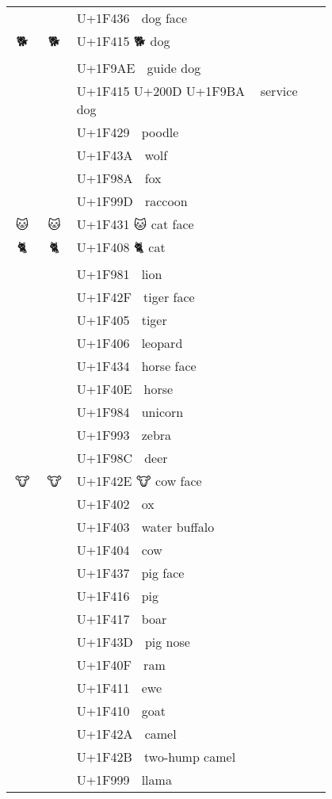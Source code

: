\documentclass[a4paper,12pt]{ltjarticle}
\newcommand{\fontA}[1]{{\fontspec[RawFeature={mode=harf,+dist,+ccmp}]{Segoe UI Emoji} #1}}
\newcommand{\fontB}[1]{{\fontspec[RawFeature={mode=harf,+dist,+ccmp}]{Noto Color Emoji} #1}}
\begin{document}
\begin{longtable}[c]{ccp{0.8\linewidth}}
\fontA{🐶}&\fontB{🐶}&U+1F436 🐶 dog face\\
\fontA{🐕}&\fontB{🐕}&U+1F415 🐕 dog\\
\fontA{🦮}&\fontB{🦮}&U+1F9AE 🦮 guide dog\\
\fontA{🐕‍🦺}&\fontB{🐕‍🦺}&U+1F415 U+200D U+1F9BA 🐕‍🦺 service dog\\
\fontA{🐩}&\fontB{🐩}&U+1F429 🐩 poodle\\
\fontA{🐺}&\fontB{🐺}&U+1F43A 🐺 wolf\\
\fontA{🦊}&\fontB{🦊}&U+1F98A 🦊 fox\\
\fontA{🦝}&\fontB{🦝}&U+1F99D 🦝 raccoon\\
\fontA{🐱}&\fontB{🐱}&U+1F431 🐱 cat face\\
\fontA{🐈}&\fontB{🐈}&U+1F408 🐈 cat\\
\fontA{🦁}&\fontB{🦁}&U+1F981 🦁 lion\\
\fontA{🐯}&\fontB{🐯}&U+1F42F 🐯 tiger face\\
\fontA{🐅}&\fontB{🐅}&U+1F405 🐅 tiger\\
\fontA{🐆}&\fontB{🐆}&U+1F406 🐆 leopard\\
\fontA{🐴}&\fontB{🐴}&U+1F434 🐴 horse face\\
\fontA{🐎}&\fontB{🐎}&U+1F40E 🐎 horse\\
\fontA{🦄}&\fontB{🦄}&U+1F984 🦄 unicorn\\
\fontA{🦓}&\fontB{🦓}&U+1F993 🦓 zebra\\
\fontA{🦌}&\fontB{🦌}&U+1F98C 🦌 deer\\
\fontA{🐮}&\fontB{🐮}&U+1F42E 🐮 cow face\\
\fontA{🐂}&\fontB{🐂}&U+1F402 🐂 ox\\
\fontA{🐃}&\fontB{🐃}&U+1F403 🐃 water buffalo\\
\fontA{🐄}&\fontB{🐄}&U+1F404 🐄 cow\\
\fontA{🐷}&\fontB{🐷}&U+1F437 🐷 pig face\\
\fontA{🐖}&\fontB{🐖}&U+1F416 🐖 pig\\
\fontA{🐗}&\fontB{🐗}&U+1F417 🐗 boar\\
\fontA{🐽}&\fontB{🐽}&U+1F43D 🐽 pig nose\\
\fontA{🐏}&\fontB{🐏}&U+1F40F 🐏 ram\\
\fontA{🐑}&\fontB{🐑}&U+1F411 🐑 ewe\\
\fontA{🐐}&\fontB{🐐}&U+1F410 🐐 goat\\
\fontA{🐪}&\fontB{🐪}&U+1F42A 🐪 camel\\
\fontA{🐫}&\fontB{🐫}&U+1F42B 🐫 two-hump camel\\
\fontA{🦙}&\fontB{🦙}&U+1F999 🦙 llama\\

\end{longtable}
\end{document}
